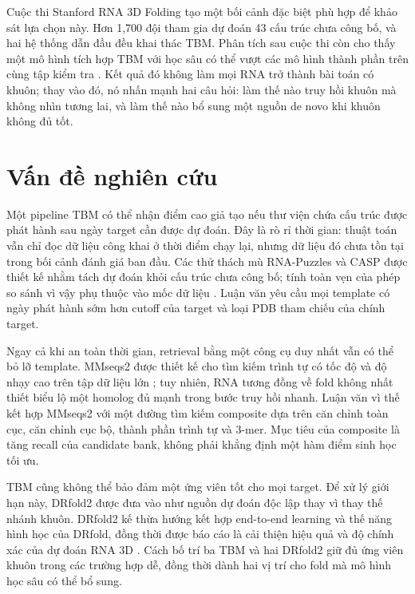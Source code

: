 \documentclass[12pt,a4paper,oneside]{report}
\begin{document}
Cuộc thi Stanford RNA 3D Folding tạo một bối cảnh đặc biệt phù hợp để khảo sát lựa chọn
này. Hơn 1,700 đội tham gia dự đoán 43 cấu trúc chưa công bố, và hai hệ thống dẫn đầu
đều khai thác TBM. Phân tích sau cuộc thi còn cho thấy một mô hình tích hợp TBM với học
sâu có thể vượt các mô hình thành phần trên cùng tập kiểm tra
\cite{competition_paper}. Kết quả đó không làm mọi RNA trở thành bài toán có khuôn;
thay vào đó, nó nhấn mạnh hai câu hỏi: làm thế nào truy hồi khuôn mà không nhìn tương
lai, và làm thế nào bổ sung một nguồn de novo khi khuôn không đủ tốt.

\section{Vấn đề nghiên cứu}

Một pipeline TBM có thể nhận điểm cao giả tạo nếu thư viện chứa cấu trúc được phát hành
sau ngày target cần được dự đoán. Đây là rò rỉ thời gian: thuật toán vẫn chỉ đọc dữ liệu
công khai ở thời điểm chạy lại, nhưng dữ liệu đó chưa tồn tại trong bối cảnh đánh giá
ban đầu. Các thử thách mù RNA-Puzzles và CASP được thiết kế nhằm tách dự đoán khỏi cấu
trúc chưa công bố; tính toàn vẹn của phép so sánh vì vậy phụ thuộc vào mốc dữ liệu
\cite{rna_puzzles,casp15,competition_paper}. Luận văn yêu cầu mọi template có ngày phát
hành sớm hơn cutoff của target và loại PDB tham chiếu của chính target.

Ngay cả khi an toàn thời gian, retrieval bằng một công cụ duy nhất vẫn có thể bỏ lỡ
template. MMseqs2 được thiết kế cho tìm kiếm trình tự có tốc độ và độ nhạy cao trên tập
dữ liệu lớn \cite{mmseqs2}; tuy nhiên, RNA tương đồng về fold không nhất thiết biểu lộ
một homolog đủ mạnh trong bước truy hồi nhanh. Luận văn vì thế kết hợp MMseqs2 với một
đường tìm kiếm composite dựa trên căn chỉnh toàn cục, căn chỉnh cục bộ, thành phần trình
tự và 3-mer. Mục tiêu của composite là tăng recall của candidate bank, không phải khẳng
định một hàm điểm sinh học tối ưu.

TBM cũng không thể bảo đảm một ứng viên tốt cho mọi target. Để xử lý giới hạn này,
DRfold2 được đưa vào như nguồn dự đoán độc lập thay vì thay thế nhánh khuôn. DRfold2 kế
thừa hướng kết hợp end-to-end learning và thế năng hình học của DRfold, đồng thời được
báo cáo là cải thiện hiệu quả và độ chính xác của dự đoán RNA 3D
\cite{drfold,drfold2}. Cách bố trí ba TBM và hai DRfold2 giữ đủ ứng viên khuôn trong các
trường hợp dễ, đồng thời dành hai vị trí cho fold mà mô hình học sâu có thể bổ sung.
\end{document}
